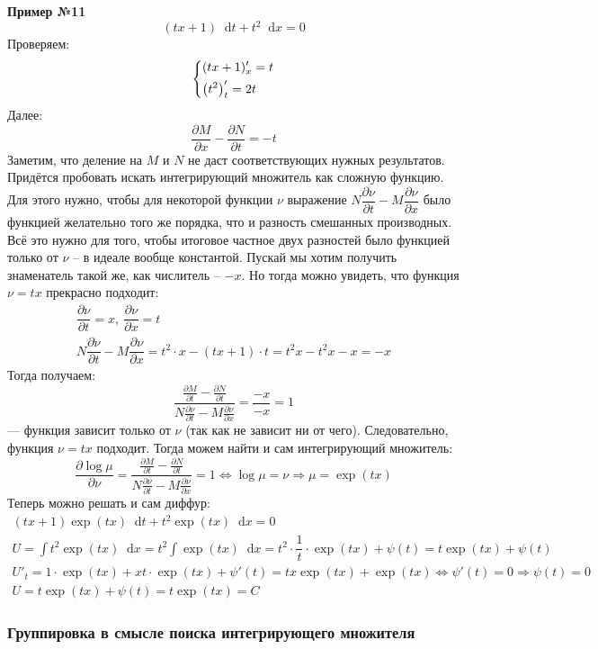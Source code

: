\documentclass[a4paper,12pt]{article}
\renewcommand*\d{\mathop{}\!\mathrm{d}}
\newcommand{\ds}{\displaystyle}
\begin{document}
\textbf{Пример №11}
\[(tx + 1)\d t + t^2 \d x = 0\]
Проверяем:
\[\left\{\begin{gathered}
(tx + 1)'_x = t\hfill\\
\left(t^2 \right)'_t = 2t\hfill
\end{gathered}\right.\]
Далее:
\[\dfrac{\partial M}{\partial x} - \dfrac{\partial N}{\partial t} = -t\]
Заметим, что деление на $M$ и $N$ не даст соответствующих нужных результатов. Придётся пробовать искать интегрирующий множитель как сложную функцию. Для этого нужно, чтобы для некоторой функции $\nu$ выражение $N \dfrac{\partial\nu}{\partial t} - M\dfrac{\partial \nu}{\partial x}$ было функцией желательно того же порядка, что и разность смешанных производных. Всё это нужно для того, чтобы итоговое частное двух разностей было функцией только от $\nu$ -- в идеале вообще константой. Пускай мы хотим получить знаменатель такой же, как числитель -- $-x$. Но тогда можно увидеть, что функция $\nu = tx$ прекрасно подходит:
\begin{gather*}
\dfrac{\partial \nu}{\partial t} = x,\ \dfrac{\partial \nu}{\partial x} = t\\
N \dfrac{\partial\nu}{\partial t} - M\dfrac{\partial \nu}{\partial x} = t^2 \cdot x - (tx + 1)\cdot t  = t^2x  - t^2 x - x = -x
\end{gather*}
Тогда получаем:
\[\dfrac{\frac{\partial M}{\partial t} - \frac{\partial N}{\partial t}}{N \frac{\partial\nu}{\partial t} - M\frac{\partial \nu}{\partial x}} = \dfrac{-x}{-x} = 1\] --- функция зависит только от $\nu$ (так как не зависит ни от чего). Следовательно, функция $\nu = tx$ подходит. Тогда можем найти и сам интегрирующий множитель:
\[\dfrac{\partial \log\mu}{\partial \nu} =  \dfrac{\frac{\partial M}{\partial t} - \frac{\partial N}{\partial t}}{N \frac{\partial\nu}{\partial t} - M\frac{\partial \nu}{\partial x}} = 1 \iff \log\mu = \nu \Longrightarrow \mu = \exp(tx)\]
Теперь можно решать и сам диффур:
\begin{gather*}
(tx + 1)\exp(tx)\d t + t^2\exp(tx)\d x = 0\\
U = \ds\int t^2\exp(tx)\d x = t^2\ds\int\exp(tx)\d x = t^2 \cdot \dfrac{1}{t}\cdot \exp(tx) + \psi(t) = t\exp(tx) + \psi(t)\\
U'_t = 1\cdot \exp(tx) + xt\cdot\exp(tx) + \psi'(t) = tx\exp(tx) + \exp(tx) \iff \psi'(t) = 0 \Longrightarrow \psi(t) = 0\\
U = t\exp(tx) + \psi(t) = t\exp(tx) = C
\end{gather*}

\subsubsection{Группировка в смысле поиска интегрирующего множителя}
\end{document}
